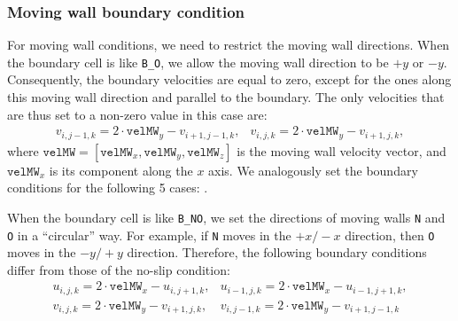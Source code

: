 \documentclass[a4paper, 12pt]{article}
\begin{document}
\subsubsection{Moving wall boundary condition}\label{sec:moving_wall}
For moving wall conditions, we need to restrict the moving wall directions.
When the boundary cell is like \texttt{B\_O}, we allow the moving wall direction to be $+y$ or $-y$. Consequently, the boundary velocities are equal to zero,
 except for the ones along this moving wall direction and parallel to the boundary. The only velocities that are thus set to a non-zero value in this case are:
\begin{equation}
\begin{array}{ll}
v_{i,j-1,k} = 2\cdot\texttt{velMW}_y-v_{i+1,j-1,k}, & v_{i,j,k} = 2\cdot\texttt{velMW}_y-v_{i+1,j,k}, 
\end{array}
\end{equation}
where $\texttt{velMW} = [\texttt{velMW}_x, \texttt{velMW}_y, \texttt{velMW}_z]$ is the moving wall velocity vector, and $\texttt{velMW}_x$ is its component along the $x$ axis. We analogously set the boundary conditions for the following 5 cases: .

When the boundary cell is like \texttt{B\_NO}, we set the directions of moving walls \texttt{N} and \texttt{O} in a ``circular'' way. For example, if \texttt{N} moves in the $+x/-x$ direction, then \texttt{O} moves in the $-y/+y$ direction. Therefore, the following boundary conditions differ from those of the no-slip condition:
\begin{equation}
\begin{array}{ll}
u_{i,j,k} = 2\cdot\texttt{velMW}_x-u_{i,j+1,k}, & u_{i-1,j,k} = 2\cdot\texttt{velMW}_x-u_{i-1,j+1,k}, \\
v_{i,j,k} = 2\cdot\texttt{velMW}_y-v_{i+1,j,k}, & v_{i,j-1,k} = 2\cdot\texttt{velMW}_y-v_{i+1,j-1,k}
\end{array}
\end{equation}
\end{document}
